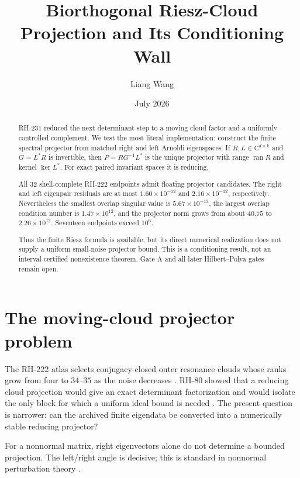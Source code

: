 \documentclass[11pt]{article}
\title{Biorthogonal Riesz-Cloud Projection and Its Conditioning Wall}
\author{Liang Wang}
\date{July 2026}
\theoremstyle{remark}
\newcommand{\C}{\mathbb C}
\begin{document}
\maketitle

\begin{abstract}
RH-231 reduced the next determinant step to a moving cloud factor and a
uniformly controlled complement.  We test the most literal implementation:
construct the finite spectral projector from matched right and left Arnoldi
eigenspaces.  If $R,L\in\C^{d\times k}$ and $G=L^*R$ is invertible, then
$P=RG^{-1}L^*$ is the unique projector with range $\operatorname{ran}R$ and
kernel $\ker L^*$.  For exact paired invariant spaces it is reducing.

All 32 shell-complete RH-222 endpoints admit floating projector candidates.
The right and left eigenpair residuals are at most $1.60\times10^{-12}$ and
$2.16\times10^{-12}$, respectively.  Nevertheless the smallest overlap
singular value is $5.67\times10^{-13}$, the largest overlap condition number
is $1.47\times10^{12}$, and the projector norm grows from about $40.75$ to
$2.26\times10^{12}$.  Seventeen endpoints exceed $10^6$.

Thus the finite Riesz formula is available, but its direct numerical
realization does not supply a uniform small-noise projector bound.  This is a
conditioning result, not an interval-certified nonexistence theorem.  Gate A
and all later Hilbert--Polya gates remain open.
\end{abstract}

\section{The moving-cloud projector problem}

The RH-222 atlas selects conjugacy-closed outer resonance clouds whose ranks
grow from four to $34$--$35$ as the noise decreases
\citep{WangRH222,WangRH231}.  RH-80 showed that a reducing cloud projection
would give an exact determinant factorization and would isolate the only
block for which a uniform ideal bound is needed \citep{WangRH80}.  The
present question is narrower: can the archived finite eigendata be converted
into a numerically stable reducing projector?

For a nonnormal matrix, right eigenvectors alone do not determine a bounded
projection.  The left/right angle is decisive; this is standard in
nonnormal perturbation theory \citep{Kato1995,TrefethenEmbree2005}.
\end{document}
